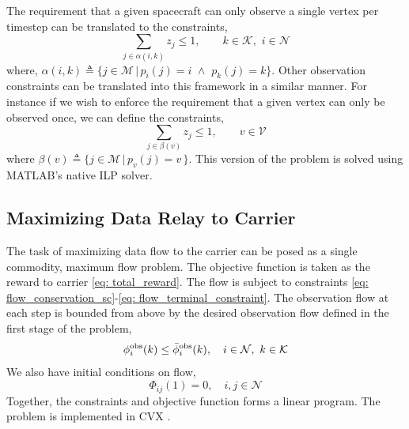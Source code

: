 \documentclass[letterpaper, 10 pt, conference]{ieeeconf}  %
\newcommand{\mm}[1]{\textcolor{OliveGreen}{\textrm{(#1 - MM)}}}   %
\theoremstyle{definition}
\begin{document}
The requirement that a given spacecraft can only observe a single vertex per timestep can be translated to the constraints, 
\begin{equation}
     \sum_{j\in \alpha(i,k)}z_j\leq 1,\qquad {k\in\mathcal{K}},\,\,{i\in\mathcal{N}}
\end{equation}
where, $\alpha(i,k)\triangleq\{j\in\mathcal{M} \,|\, p_i(j) = i\,\,\wedge\,\, p_k(j)=k\}$. 
Other observation constraints can be translated into this framework in a similar manner. For instance if we wish to enforce the requirement that a given vertex can only be observed once, we can define the constraints, 
\begin{equation}
     \sum_{j\in \beta(v)}z_j\leq 1, \qquad v\in\mathcal{V}
\end{equation}
where $\beta(v)\triangleq\{j\in\mathcal{M}\,|\,p_v(j)=v\,\}$.
This version of the problem is solved using MATLAB's native ILP solver. 

\subsection{Maximizing Data Relay to Carrier} \label{sec: communication_flow_optimizer}

The task of maximizing data flow to the carrier can be posed as a single commodity, maximum flow problem. 
The objective function is taken as the reward to carrier \eqref{eq: total_reward}. The flow is subject to constraints \eqref{eq: flow_conservation_sc}-\eqref{eq: flow_terminal_constraint}.
The observation flow at each step is bounded from above by the desired observation flow defined in the first stage of the problem,
\begin{equation} \label{eq: obs_flow_bound}
    \phi_i^{\rm obs}(k) \leq \bar{\phi}_i^{\rm obs}(k), \quad i\in\mathcal{N}, \,\, k\in\mathcal{K}
\end{equation}
We also have initial conditions on flow, 
\begin{equation}
    \Phi_{ij}(1)=0, \quad i,j\in\mathcal{N}
\end{equation}
Together, the constraints and objective function forms a linear program. The problem is implemented in CVX \cite{grant2008cvx}. 


\end{document}
